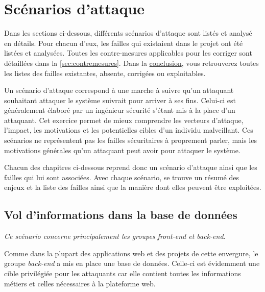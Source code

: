 \documentclass[12pt]{article}
\begin{document}
\section{Scénarios d'attaque}
\label{sec:scenarios}

Dans les sections ci-dessous, différents scénarios d'attaque sont listés et analysé en détails. Pour chacun d'eux, les failles qui existaient dans le projet ont été listées et analysées. Toutes les contre-mesures applicables pour les corriger sont détaillées dans la \autoref{sec:contremesures}. Dans la \hyperref[sec:conclusion]{conclusion}, vous retrouverez toutes les listes des failles existantes, absente, corrigées ou exploitables.

Un scénario d'attaque correspond à une marche à suivre qu'un attaquant souhaitant attaquer le système suivrait pour arriver à ses fins. Celui-ci est généralement élaboré par un ingénieur sécurité s'étant mis à la place d'un attaquant. Cet exercice permet de mieux comprendre les vecteurs d'attaque, l'impact, les motivations et les potentielles cibles d'un individu malveillant. Ces scénarios ne représentent pas les failles sécuritaires à proprement parler, mais les motivations générales qu'un attaquant peut avoir pour attaquer le système.

Chacun des chapitres ci-dessous reprend donc un scénario d'attaque ainsi que les failles qui lui sont associées. Avec chaque scénario, se trouve un résumé des enjeux et la liste des failles ainsi que la manière dont elles peuvent être exploitées.

\subsection{Vol d'informations dans la base de données}

\emph{Ce scénario concerne principalement les groupes front-end et back-end}.
\medskip

Comme dans la plupart des applications web et des projets de cette envergure, le groupe \emph{back-end} a mis en place une base de données. Celle-ci est évidemment une cible privilégiée pour les attaquants car elle contient toutes les informations métiers et celles nécessaires à la plateforme web.
\medskip
\end{document}
